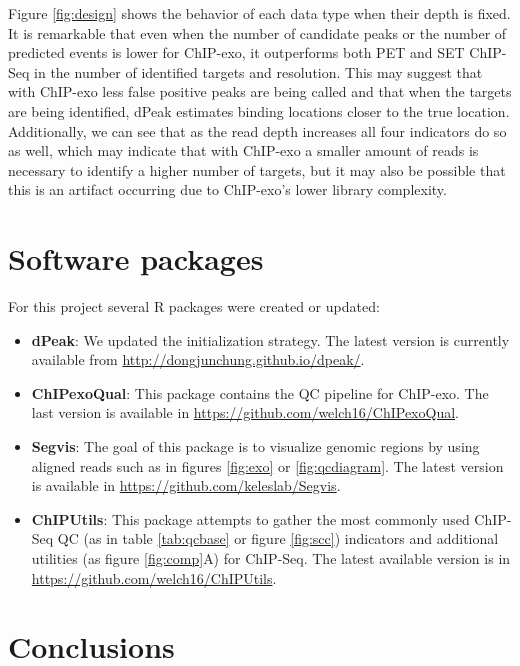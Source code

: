 \documentclass[11pt]{article}\usepackage[]{graphicx}\usepackage[]{color}
\begin{document}
Figure \ref{fig:design} shows the behavior of each data type when
their depth is fixed. It is remarkable that even when the number of
candidate peaks or the number of predicted events is lower for
ChIP-exo, it outperforms both PET and SET ChIP-Seq in the number of
identified targets and resolution. This may suggest that with ChIP-exo
less false positive peaks are being called and that when the targets
are being identified, dPeak estimates binding locations closer to the
true location. Additionally, we can see that as the read depth
increases all four indicators do so as well, which may indicate that
with ChIP-exo a smaller amount of reads is necessary to identify a
higher number of targets, but it may also be possible that this is an
artifact occurring due to ChIP-exo's lower library complexity.

\section{Software packages}
\label{sec:software}

For this project several R packages were created or updated:

\begin{itemize}
\item \textbf{dPeak}: We updated the initialization strategy. The
  latest version is currently available from
  \url{http://dongjunchung.github.io/dpeak/}.
\item \textbf{ChIPexoQual}: This package contains the QC pipeline for
  ChIP-exo. The last version is available in
  \url{https://github.com/welch16/ChIPexoQual}.
\item \textbf{Segvis}: The goal of this package is to visualize
  genomic regions by using aligned reads such as in figures
  \ref{fig:exo} or \ref{fig:qcdiagram}.  The latest version is
  available in \url{https://github.com/keleslab/Segvis}.
\item \textbf{ChIPUtils}: This package attempts to gather the most
  commonly used ChIP-Seq QC (as in table \ref{tab:qcbase} or figure
  \ref{fig:scc}) indicators and additional utilities (as figure
  \ref{fig:comp}A) for ChIP-Seq. The latest available version is in
  \url{https://github.com/welch16/ChIPUtils}.
\end{itemize}

\section{Conclusions}
\label{sec:conclusions}
\end{document}
